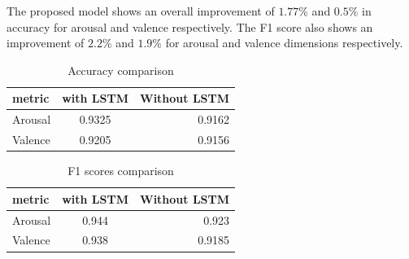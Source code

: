 The proposed model shows an overall improvement of $1.77$\% and $0.5$\% in accuracy for arousal and valence respectively. The F1 score also shows an improvement of $2.2$\% and $1.9$\% for arousal and valence dimensions respectively.
\begin{table}[ht]
    \centering
    \begin{tabular}{lcr} %
    \toprule
    metric & with LSTM & Without LSTM  \\
    \midrule
    Arousal & 0.9325 & 0.9162 \\
    Valence & 0.9205 & 0.9156 \\
    \bottomrule
    \end{tabular}
    \caption{Accuracy comparison}
    \label{tab:example}
\end{table}
\begin{table}[ht]
    \centering
    \begin{tabular}{lcr} %
    \toprule
    metric & with LSTM & Without LSTM  \\
    \midrule
    Arousal & 0.944 & 0.923 \\
    Valence & 0.938 & 0.9185 \\
    \bottomrule
    \end{tabular}
    \caption{F1 scores comparison}
    \label{tab:example}
\end{table}
    
    


